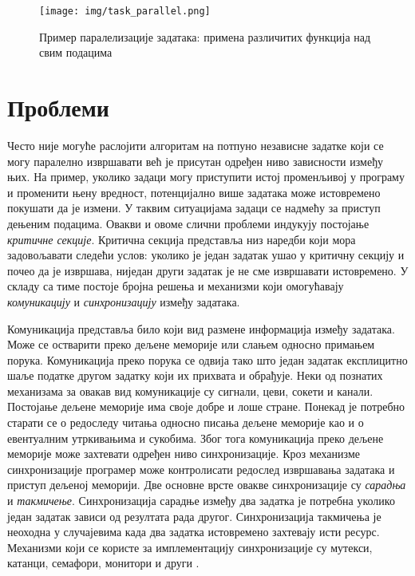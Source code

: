 \documentclass[12pt,oneside]{memoir}
\begin{document}
\begin{figure}[!ht]
  \centering
  \texttt{[image: img/task\_parallel.png]}
  \caption{Пример паралелизације задатака: примена различитих функција над свим подацима}
  \label{fig:task_parallel}
\end{figure}


  \section{Проблеми}
  Често није могуће раслојити алгоритам на потпуно независне задатке који се могу паралелно извршавати већ је присутан одређен ниво зависности између њих. На пример, уколико задаци могу приступити истој променљивој у програму и променити њену вредност, потенцијално више задатака може истовремено покушати да је измени. У таквим ситуацијама задаци се надмећу за приступ дењеним подацима.  Овакви и овоме слични проблеми индукују постојање \emph{критичне секције}. Критична секција представља низ наредби који мора задовољавати следећи услов: уколико је један задатак ушао у критичну секцију и почео да је извршава, ниједан други задатак је не сме извршавати истовремено. У складу са тиме постоје бројна решења и механизми који омогућавају \emph{комуникацију} и  \emph{синхронизацију} између задатака.
  
  
Комуникација представља било који вид размене информација између задатака. Може се остварити преко дељене меморије или слањем односно примањем порука. Комуникација преко порука се одвија тако што један задатак експлицитно шаље податке другом задатку који их прихвата и обрађује. Неки од познатих механизама за овакав вид комуникације су сигнали, цеви, сокети и канали.
Постојање дељене меморије има своје добре и лоше стране. Понекад је потребно старати се о редоследу читања односно писања дељене меморије као и о евентуалним утркивањима и сукобима. Због тога комуникација преко дељене меморије може захтевати одређен ниво синхронизације. Кроз механизме синхронизације програмер може контролисати редослед извршавања задатака и приступ дељеној меморији. Две основне врсте овакве синхронизације су \emph{сарадња} и \emph{такмичење}. Синхронизација сарадње између два задатка је потребна уколико један задатак зависи од резултата рада другог. Синхронизација такмичења је неоходна у случајевима када два задатка истовремено захтевају исти ресурс. Механизми који се користе за имплементацију синхронизације су мутекси, катанци, семафори, монитори и други \cite{lang_prag}.
\end{document}
